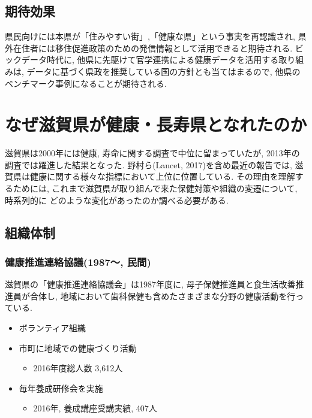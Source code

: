 \section{期待効果}
県民向けには本県が「住みやすい街」,「健康な県」という事実を再認識され, 県外在住者には移住促進政策のための発信情報として活用できると期待される.
ビックデータ時代に, 他県に先駆けて官学連携による健康データを活用する取り組みは, データに基づく県政を推奨している国の方針とも当てはまるので, 他県のベンチマーク事例になることが期待される.

\chapter{なぜ滋賀県が健康・長寿県となれたのか}
滋賀県は2000年には健康, 寿命に関する調査で中位に留まっていたが,
2013年の調査では躍進した結果となった.
野村ら(Lancet, 2017)を含め最近の報告では, 滋賀県は健康に関する様々な指標において上位に位置している.
その理由を理解するためには, これまで滋賀県が取り組んで来た保健対策や組織の変遷について, 時系列的に
どのような変化があったのか調べる必要がある.

\section{組織体制}
\subsection{健康推進連絡協議(1987〜, 民間)}
滋賀県の「健康推進連絡協議会」は1987年度に, 母子保健推進員と食生活改善推進員が合体し, 地域において歯科保健も含めたさまざまな分野の健康活動を行っている.
\begin{itemize} \setlength{\itemsep}{-0.5mm} \setlength{\parskip}{-0.5mm}

	\item  ボランティア組織
	\item  市町に地域での健康づくり活動
	      \begin{itemize} \setlength{\itemsep}{-0.5mm} \setlength{\parskip}{-0.5mm}
		      \item 2016年度総人数 3,612人
	      \end{itemize}
	\item  毎年養成研修会を実施
	      \begin{itemize} \setlength{\itemsep}{-0.5mm} \setlength{\parskip}{-0.5mm}
		      \item 2016年, 養成講座受講実績, 407人
	      \end{itemize}
\end{itemize}

